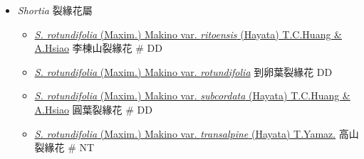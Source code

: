 
  \begin{itemize}
 \item[] \textit{Shortia} 裂緣花屬
                                
  \begin{itemize}
        \item[] \href{http://www.theplantlist.org/tpl1.1/search?q=Shortia+rotundifolia+var.+ritoensis}{\textit{S. rotundifolia} (Maxim.) Makino var. \textit{ritoensis} (Hayata) T.C.Huang \& A.Hsiao}   李棟山裂緣花  \# DD
        \item[] \href{http://www.theplantlist.org/tpl1.1/search?q=Shortia+rotundifolia+var.+rotundifolia}{\textit{S. rotundifolia} (Maxim.) Makino var. \textit{rotundifolia}}   到卵葉裂緣花   DD
        \item[] \href{http://www.theplantlist.org/tpl1.1/search?q=Shortia+rotundifolia+var.+subcordata}{\textit{S. rotundifolia} (Maxim.) Makino var. \textit{subcordata} (Hayata) T.C.Huang \& A.Hsiao}   圓葉裂緣花  \# DD
        \item[] \href{http://www.theplantlist.org/tpl1.1/search?q=Shortia+rotundifolia+var.+transalpine}{\textit{S. rotundifolia} (Maxim.) Makino var. \textit{transalpine} (Hayata) T.Yamaz.}   高山裂緣花  \# NT
  \end{itemize}
  \end{itemize}
